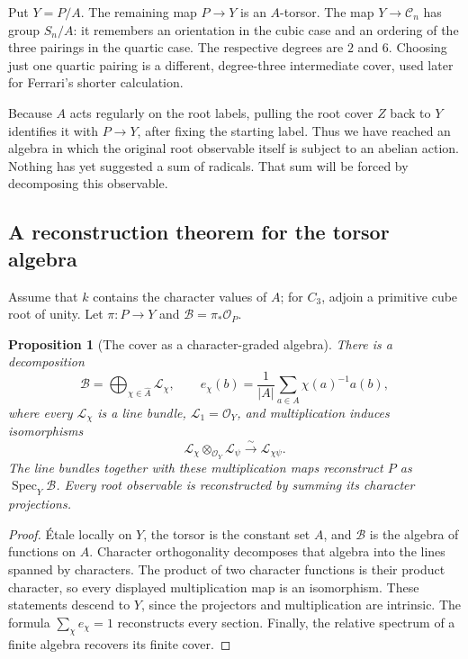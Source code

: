 \documentclass[11pt]{article}
\newtheorem{proposition}{Proposition}[section]
\theoremstyle{remark}
\newcommand{\Spec}{\operatorname{Spec}}
\begin{document}
Put \(Y=P/A\). The remaining map \(P\to Y\) is an \(A\)-torsor. The map \(Y\to \mathcal C_n\) has group \(S_n/A\): it remembers an orientation in the cubic case and an ordering of the three pairings in the quartic case. The respective degrees are \(2\) and \(6\). Choosing just one quartic pairing is a different, degree-three intermediate cover, used later for Ferrari's shorter calculation.

Because \(A\) acts regularly on the root labels, pulling the root cover \(Z\) back to \(Y\) identifies it with \(P\to Y\), after fixing the starting label. Thus we have reached an algebra in which the original root observable itself is subject to an abelian action. Nothing has yet suggested a sum of radicals. That sum will be forced by decomposing this observable.

\subsection{A reconstruction theorem for the torsor algebra}

Assume that \(k\) contains the character values of \(A\); for \(C_3\), adjoin a primitive cube root of unity. Let
\(\pi:P\to Y\) and \(\mathcal B=\pi_*\mathcal O_P\).

\begin{proposition}[The cover as a character-graded algebra]
\label{cover:first-reconstruction}
There is a decomposition
\[
\mathcal B=\bigoplus_{\chi\in\widehat A}\mathcal L_\chi,
\qquad
e_\chi(b)=\frac1{|A|}\sum_{a\in A}\chi(a)^{-1}a(b),
\]
where every \(\mathcal L_\chi\) is a line bundle,
\(\mathcal L_1=\mathcal O_Y\), and multiplication induces isomorphisms
\[
\mathcal L_\chi\otimes_{\mathcal O_Y}\mathcal L_\psi
\overset{\sim}{\longrightarrow}\mathcal L_{\chi\psi}.
\]
The line bundles together with these multiplication maps reconstruct \(P\) as
\(\Spec_Y\mathcal B\). Every root observable is reconstructed by summing its character projections.
\end{proposition}

\begin{proof}
\'Etale locally on \(Y\), the torsor is the constant set \(A\), and
\(\mathcal B\) is the algebra of functions on \(A\). Character orthogonality decomposes that algebra into the lines spanned by characters. The product of two character functions is their product character, so every displayed multiplication map is an isomorphism. These statements descend to \(Y\), since the projectors and multiplication are intrinsic. The formula
\(\sum_\chi e_\chi=1\) reconstructs every section. Finally, the relative spectrum of a finite algebra recovers its finite cover.
\end{proof}
\end{document}
